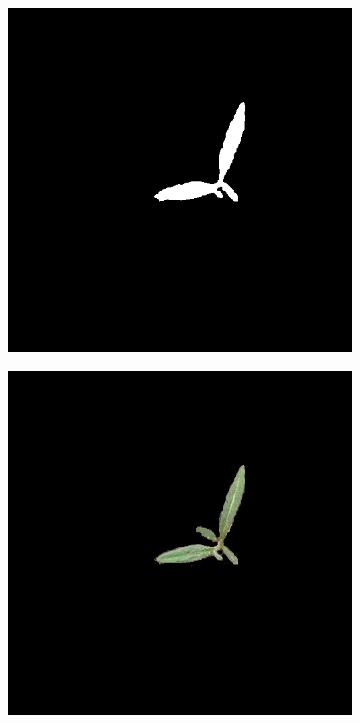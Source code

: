 \begin{figure}[H]
\begin{subfigure}[b]{0.3\textwidth}
		\caption{}
		\label{fig:seg_f}
    \end{subfigure}
    \begin{subfigure}[b]{0.3\textwidth}
        \centering
        \includegraphics[width=\textwidth]{./figure/result/segmentation/imgHSIThresholdClean.png}
		\caption{}
		\label{fig:seg_g}
    \end{subfigure}
    \begin{subfigure}[b]{0.3\textwidth}
        \centering
        \includegraphics[width=\textwidth]{./figure/result/segmentation/imgSEG.png}

\end{subfigure}
\end{figure}
